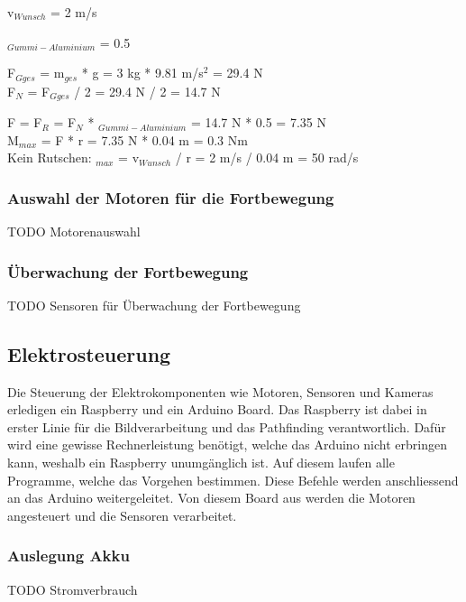 v$_{Wunsch}$ = 2 m/s

{\mu$_{Gummi-Aluminium}$} = 0.5

F$_{Gges}$ = m$_{ges}$ * g = 3 kg * 9.81 m/s$^{2}$ = 29.4 N\\



F$_{N}$ = F$_{Gges}$ / 2 = 29.4 N / 2 = 14.7 N 

F = F$_{R}$ = F$_{N}$ * {\mu$_{Gummi-Aluminium}$} = 14.7 N * 0.5 = 7.35 N\\



M$_{max}$ = F * r = 7.35 N * 0.04 m = 0.3 Nm\\



Kein Rutschen: {\omega$_{max}$} = v$_{Wunsch}$ / r = 2 m/s / 0.04 m = 50 rad/s


\subsubsection{Auswahl der Motoren für die Fortbewegung}

TODO Motorenauswahl

\subsubsection{Überwachung der Fortbewegung}

TODO Sensoren für Überwachung der Fortbewegung

\subsection{Elektrosteuerung}
Die Steuerung der Elektrokomponenten wie Motoren, Sensoren und Kameras erledigen ein Raspberry und ein Arduino Board. Das Raspberry ist dabei in erster Linie für die Bildverarbeitung und das Pathfinding verantwortlich. Dafür wird eine gewisse Rechnerleistung benötigt, welche das Arduino nicht erbringen kann, weshalb ein Raspberry unumgänglich ist.
Auf diesem laufen alle Programme, welche das Vorgehen bestimmen. Diese Befehle werden anschliessend an das Arduino weitergeleitet. Von diesem Board aus werden die Motoren angesteuert und die Sensoren verarbeitet.

\subsubsection{Auslegung Akku}

TODO Stromverbrauch


